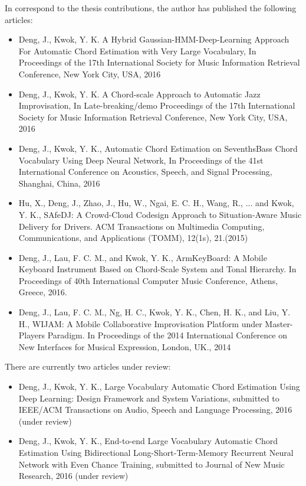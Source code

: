 In correspond to the thesis contributions, the author has published the following articles:
\begin{itemize}
\item Deng, J., Kwok, Y. K. A Hybrid Gaussian-HMM-Deep-Learning Approach For Automatic Chord Estimation with Very Large Vocabulary, In Proceedings of the 17th International Society for Music Information Retrieval Conference, New York City, USA, 2016
\item Deng, J., Kwok, Y. K. A Chord-scale Approach to Automatic Jazz Improvisation, In Late-breaking/demo Proceedings of the 17th International Society for Music Information Retrieval Conference, New York City, USA, 2016
\item Deng, J., Kwok, Y. K., Automatic Chord Estimation on SeventhsBass Chord Vocabulary Using Deep Neural Network, In Proceedings of the 41st International Conference on Acoustics, Speech, and Signal Processing, Shanghai, China, 2016
\item Hu, X., Deng, J., Zhao, J., Hu, W., Ngai, E. C. H., Wang, R., ... and Kwok, Y. K., SAfeDJ: A Crowd-Cloud Codesign Approach to Situation-Aware Music Delivery for Drivers. ACM Transactions on Multimedia Computing, Communications, and Applications (TOMM), 12(1s), 21.(2015)
\item Deng, J., Lau, F. C. M., and Kwok, Y. K., ArmKeyBoard: A Mobile Keyboard Instrument Based on Chord-Scale System and Tonal Hierarchy. In Proceedings of 40th International Computer Music Conference, Athens, Greece, 2016.
\item Deng, J., Lau, F. C. M., Ng, H. C., Kwok, Y. K., Chen, H. K., and Liu, Y. H., WIJAM: A Mobile Collaborative Improvisation Platform under Master-Players Paradigm. In Proceedings of the 2014 International Conference on New Interfaces for Musical Expression, London, UK., 2014
\end{itemize}

There are currently two articles under review:
\begin{itemize}
\item Deng, J., Kwok, Y. K., Large Vocabulary Automatic Chord Estimation Using Deep Learning: Design Framework and System Variations, submitted to IEEE/ACM Transactions on Audio, Speech and Language Processing, 2016 (under review)
\item Deng, J., Kwok, Y. K., End-to-end Large Vocabulary Automatic Chord Estimation Using Bidirectional Long-Short-Term-Memory Recurrent Neural Network with Even Chance Training, submitted to Journal of New Music Research, 2016 (under review)
\end{itemize}





